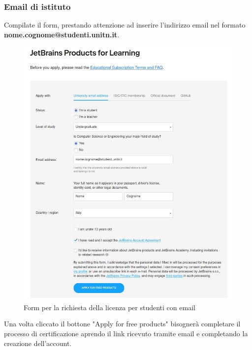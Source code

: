         \subsubsection{Email di istituto}
            Compilate il form, prestando attenzione ad inserire l'indirizzo email nel formato 
            \textbf{nome.cognome@studenti.unitn.it}.
            \begin{figure}[H]
                \centering
                \graphicspath{{src/capitoli/04/img/}}
                \includegraphics[width=1\textwidth]{form-studente-email.png}
                \caption{Form per la richiesta della licenza per studenti con email}
                \label{fig:Form per la richiesta della licenza per studenti con email}
            \end{figure}

            Una volta cliccato il bottone "Apply for free products" bisognerà completare il processo di certificazione aprendo il link ricevuto tramite email e completando 
            la creazione dell'account.
        
